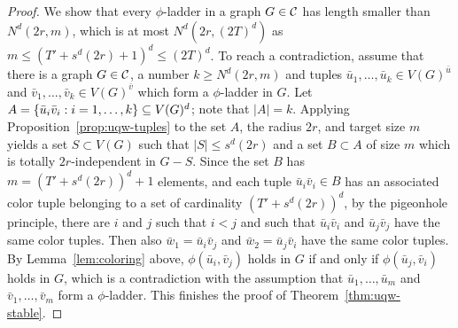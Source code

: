 \begin{proof}
We show that 
every $\phi$-ladder in a graph $G\in\cal C$ has length smaller than $N^d(2r,m)$, which is at most $N^d(2r,(2T)^d)$ as $m\le (T'+s^d(2r)+1)^d\le (2T)^d$.
To reach a contradiction, assume that there is a graph $G\in\cal C$, a number $k\ge N^d(2r,m)$
and tuples $\bar u_1,\ldots,\bar u_k\in V(G)^{\bar u}$ and $\bar v_1,\ldots,\bar v_k\in V(G)^{\bar v}$
which form a $\phi$-ladder in $G$.
	Let $A=\set{\bar u_i\bar v_i: i=1,\ldots,k}\subset V(G)^d$; note that $|A|=k$.
Applying Proposition~\ref{prop:uqw-tuples} to the set $A$, the radius $2r$, and target size $m$
		 yields a set $S\subset V(G)$ such that $|S|\le s^d(2r)$
	and a set $B\subset A$ of size $m$ which is totally $2r$-independent in $G-S$.
%
%
%
Since the set $B$ has $m=(T'+s^d(2r))^d+1$ elements,
and each tuple $\bar u_i\bar v_i\in B$ has an associated color tuple 
belonging to a set of cardinality $(T'+s^d(2r))^d$, 
by the pigeonhole principle, there are $i$ and $j$ 
such that $i<j$ and such that $\bar u_i\bar v_i$ and $\bar u_j\bar v_j$ 
 have the same color tuples. Then also  $\bar w_1=\bar u_i\bar v_j$
and $\bar w_2=\bar u_j\bar v_i$ have the same color tuples.
By Lemma~\ref{lem:coloring} above,  $\phi(\bar u_i,\bar v_j)$ holds in $G$
 if and only if $\phi(\bar u_j,\bar v_i)$ holds in $G$, which is a contradiction with the assumption that $\bar u_1,\ldots,\bar u_m$ and $\bar v_1,\ldots,\bar v_m$ form a $\phi$-ladder.
 This finishes the proof of Theorem~\ref{thm:uqw-stable}.
\end{proof}


